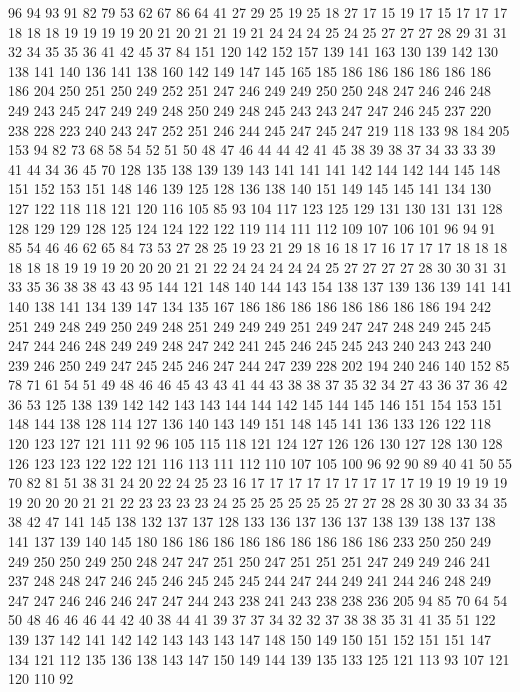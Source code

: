 96 94 93 91 82 79 53 62 67 86 64 41 27 29 25 19 25 18 27 17
15 19 17 15 17 17 17 18 18 18 19 19 19 19 20 21 20 21 21 19
21 24 24 24 25 24 25 27 27 27 28 29 31 31 32 34 35 35 36 41
42 45 37 84 151 120 142 152 157 139 141 163 130 139 142 130 138 141 140 136
141 138 160 142 149 147 145 165 185 186 186 186 186 186 186 186 204 250 251 250
249 252 251 247 246 249 249 250 250 248 247 246 246 248 249 243 245 247 249 249
248 250 249 248 245 243 243 247 247 246 245 237 220 238 228 223 240 243 247 252
251 246 244 245 247 245 247 219 118 133 98 184 205 153 94 82 73 68 58 54
52 51 50 48 47 46 44 44 42 41 45 38 39 38 37 34 33 33 39 41
44 34 36 45 70 128 135 138 139 139 143 141 141 141 142 144 142 144 145 148
151 152 153 151 148 146 139 125 128 136 138 140 151 149 145 145 141 134 130 127
122 118 118 121 120 116 105 85 93 104 117 123 125 129 131 130 131 131 128 128
129 129 128 125 124 124 122 122 119 114 111 112 109 107 106 101 96 94 91 85
54 46 46 62 65 84 73 53 27 28 25 19 23 21 29 18 16 18 17 16
17 17 17 18 18 18 18 18 18 19 19 19 20 20 20 21 21 22 24 24
24 24 24 25 27 27 27 27 28 30 30 31 31 33 35 36 38 38 43 43
95 144 121 148 140 144 143 154 138 137 139 136 139 141 141 140 138 141 134 139
147 134 135 167 186 186 186 186 186 186 186 186 194 242 251 249 248 249 250 249
248 251 249 249 249 251 249 247 247 248 249 245 245 247 244 246 248 249 249 248
247 242 241 245 246 245 245 243 240 243 243 240 239 246 250 249 247 245 245 246
247 244 247 239 228 202 194 240 246 140 152 85 78 71 61 54 51 49 48 46
46 45 43 43 41 44 43 38 38 37 35 32 34 27 43 36 37 36 42 36
53 125 138 139 142 142 143 143 144 144 142 145 144 145 146 151 154 153 151 148
144 138 128 114 127 136 140 143 149 151 148 145 141 136 133 126 122 118 120 123
127 121 111 92 96 105 115 118 121 124 127 126 126 130 127 128 130 128 126 123
123 122 122 121 116 113 111 112 110 107 105 100 96 92 90 89 40 41 50 55
70 82 81 51 38 31 24 20 22 24 25 23 16 17 17 17 17 17 17 17
17 17 19 19 19 19 19 19 20 20 20 21 21 22 23 23 23 23 24 25
25 25 25 25 25 27 27 28 28 30 30 33 34 35 38 42 47 141 145 138
132 137 137 128 133 136 137 136 137 138 139 138 137 138 141 137 139 140 145 180
186 186 186 186 186 186 186 186 186 233 250 250 249 249 250 250 249 250 248 247
247 251 250 247 251 251 251 247 249 249 246 241 237 248 248 247 246 245 246 245
245 245 244 247 244 249 241 244 246 248 249 247 247 246 246 246 247 247 244 243
238 241 243 238 238 236 205 94 85 70 64 54 50 48 46 46 46 44 42 40
38 44 41 39 37 37 34 32 32 37 38 38 35 31 41 35 51 122 139 137
142 141 142 142 143 143 143 147 148 150 149 150 151 152 151 151 147 134 121 112
135 136 138 143 147 150 149 144 139 135 133 125 121 113 93 107 121 120 110 92
